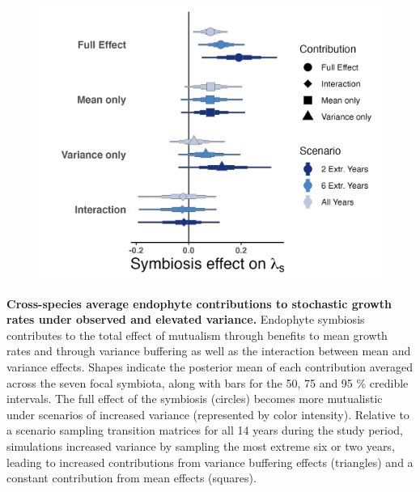 \documentclass[12pt]{article}
\begin{document}
\begin{figure}
	\centering
	\includegraphics[width=.8\linewidth]{StochDemo_fig4.png}
\end{figure}
 \textbf{Cross-species average endophyte contributions to stochastic growth rates under observed and elevated variance.} Endophyte symbiosis contributes to the total effect of mutualism through benefits to mean growth rates and through variance buffering as well as the interaction between mean and variance effects. Shapes indicate the posterior mean of each contribution averaged across the seven focal symbiota, along with bars for the 50, 75 and 95 \% credible intervals.  The full effect of the symbiosis (circles) becomes more mutualistic under scenarios of increased variance (represented by color intensity). Relative to a scenario sampling transition matrices for all 14 years during the study period, simulations increased variance by sampling the most extreme six or two years, leading to increased contributions from variance buffering effects (triangles) and a constant contribution from mean effects (squares).
\newpage
\end{document}
